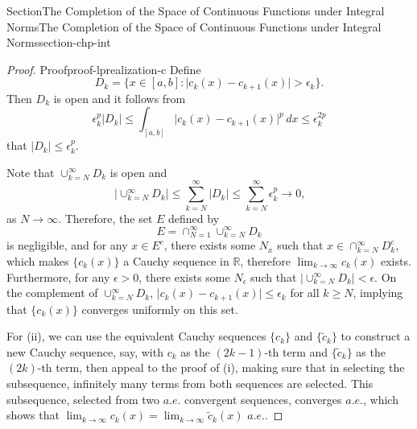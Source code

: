 \documentclass[oneside,10pt,]{article}
\numberwithin{equation}{section}
\newcommand{\bbR}{\mathbb{R}}
\begin{document}
\begin{sectionptx}{Section}{The Completion of the Space of Continuous Functions under Integral Norms}{}{The Completion of the Space of Continuous Functions under Integral Norms}{}{}{section-chp-int}
\begin{proof}{Proof}{}{proof-lprealization-c}
Define%
\begin{equation*}
D_{k} =\{x\in [a, b]: \vert c_{k}(x) -c_{k+1}(x)\vert > \epsilon_{k}\}.
\end{equation*}
Then \(D_{k}\) is open and it follows from%
\begin{equation*}
\epsilon_{k}^{p} |D_{k}| \le \int_{[a,b]} \vert c_{k}(x) -c_{k+1}(x)\vert^{p}\, dx \le \epsilon_{k}^{2p}
\end{equation*}
that \(|D_{k}|\le  \epsilon_{k}^{p}\).%
\par
Note that \(\cup_{k=N}^{\infty}D_{k}\) is open and%
\begin{equation*}
|\cup_{k=N}^{\infty}D_{k}|\le 
\sum_{k=N}^{\infty}|D_{k}| \le \sum_{k=N}^{\infty}\epsilon_{k}^{p}\to 0\text{,}
\end{equation*}
as \(N\to\infty\). Therefore, the set \(E\)\footnotemark{} defined by%
\begin{equation*}
E=\cap_{N=1}^{\infty}  \cup_{k=N}^{\infty}D_{k}
\end{equation*}
is negligible, and for any \(x\in E^{c}\), there exists some \(N_{x}\) such that \(x\in \cap_{k=N}^{\infty}D_{k}^{c}\), which makes \(\{c_{k}(x)\}\) a Cauchy sequence in \(\bbR\), therefore \(\lim_{k\to\infty} c_{k}(x)\) exists. Furthermore, for any \(\epsilon > 0\), there exists some \(N_{\epsilon}\) such that \(|\cup_{k=N}^{\infty}D_{k}| < \epsilon\). On the complement of \(\cup_{k=N}^{\infty}D_{k}\), \(\vert c_{k}(x) -c_{k+1}(x)\vert \le \epsilon_{k}\) for all \(k\ge N\), implying that \(\{c_{k}(x)\}\) converges uniformly on this set.%
\par
For (ii), we can use the equivalent Cauchy sequences \(\{ c_{k}\}\) and \(\{ \tilde c_{k}\}\) to construct a new Cauchy sequence, say, with \(c_{k}\) as the \((2k-1)\)-th term and \(\{ \tilde c_{k}\}\) as the \((2k)\)-th term, then appeal to the proof of (i), making sure that in selecting the subsequence, infinitely many terms from both sequences are selected. This subsequence, selected from two \(a.e.\) convergent  sequences, converges \(a.e.\), which shows that \(\lim_{k\to \infty} c_{k}(x)=\lim_{k\to \infty} \tilde c_{k}(x)\) \(a.e. \).%
\par

\end{proof}
\end{sectionptx}
\end{document}
